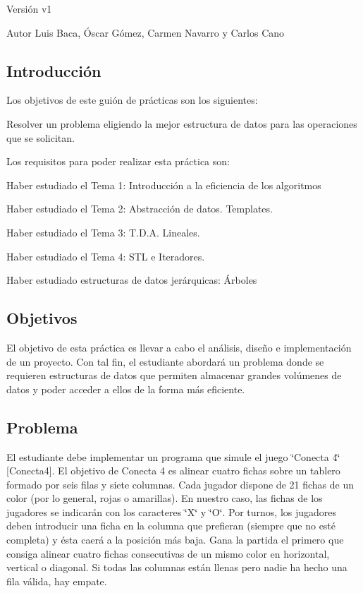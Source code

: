 \begin{DoxyVersion}{Versión}
v1 
\end{DoxyVersion}
\begin{DoxyAuthor}{Autor}
Luis Baca, Óscar Gómez, Carmen Navarro y Carlos Cano
\end{DoxyAuthor}
\hypertarget{index_introduccion}{}\subsection{Introducción}\label{index_introduccion}
Los objetivos de este guión de prácticas son los siguientes\-:
\begin{DoxyItemize}
\item Resolver un problema eligiendo la mejor estructura de datos para las operaciones que se solicitan.
\end{DoxyItemize}

Los requisitos para poder realizar esta práctica son\-:
\begin{DoxyEnumerate}
\item Haber estudiado el Tema 1\-: Introducción a la eficiencia de los algoritmos
\item Haber estudiado el Tema 2\-: Abstracción de datos. Templates.
\item Haber estudiado el Tema 3\-: T.\-D.\-A. Lineales.
\item Haber estudiado el Tema 4\-: S\-T\-L e Iteradores.
\item Haber estudiado estructuras de datos jerárquicas\-: Árboles
\end{DoxyEnumerate}\hypertarget{index_objetivos}{}\subsection{Objetivos}\label{index_objetivos}
El objetivo de esta práctica es llevar a cabo el análisis, diseño e implementación de un proyecto. Con tal fin, el estudiante abordará un problema donde se requieren estructuras de datos que permiten almacenar grandes volúmenes de datos y poder acceder a ellos de la forma más eficiente.\hypertarget{index_problema}{}\subsection{Problema}\label{index_problema}
El estudiante debe implementar un programa que simule el juego \char`\"{}\-Conecta 4\char`\"{} \mbox{[}Conecta4\mbox{]}. El objetivo de Conecta 4 es alinear cuatro fichas sobre un tablero formado por seis filas y siete columnas. Cada jugador dispone de 21 fichas de un color (por lo general, rojas o amarillas). En nuestro caso, las fichas de los jugadores se indicarán con los caracteres \char`\"{}\-X\char`\"{} y \char`\"{}\-O\char`\"{}. Por turnos, los jugadores deben introducir una ficha en la columna que prefieran (siempre que no esté completa) y ésta caerá a la posición más baja. Gana la partida el primero que consiga alinear cuatro fichas consecutivas de un mismo color en horizontal, vertical o diagonal. Si todas las columnas están llenas pero nadie ha hecho una fila válida, hay empate.

